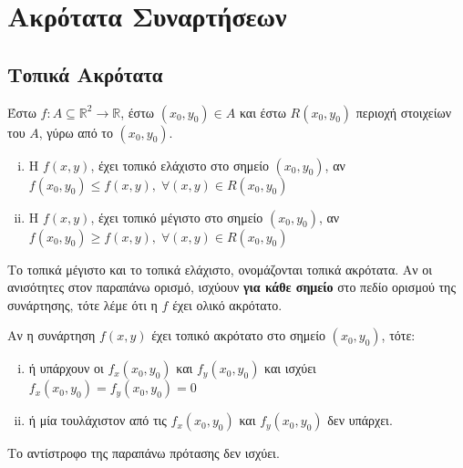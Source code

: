 \documentclass[a4paper,table]{report} 
\begin{document}
\chapter{Ακρότατα Συναρτήσεων}

\section{Τοπικά Ακρότατα}

\begin{mybox1}
\begin{dfn}
\item {}
  Έστω $ f \colon A \subseteq \mathbb{R}^{2} \to \mathbb{R} $, έστω 
  $ (x_{0}, y_{0}) \in A $ και έστω $R(x_{0}, y_{0}) $ περιοχή στοιχείων του $A$, 
  γύρω από το $ (x_{0}, y_{0}) $.
  \begin{enumerate}[i)]
    \item 
      Η $ f(x,y) $, έχει τοπικό ελάχιστο στο σημείο $ (x_{0}, y_{0}) $, αν 
      $ f(x_{0}, y_{0}) \leq f(x,y), \; \forall (x,y) \in R(x_{0}, y_{0}) $ 
    \item 
      Η $ f(x,y) $, έχει τοπικό μέγιστο στο σημείο $ (x_{0}, y_{0}) $, αν 
      $ f(x_{0}, y_{0}) \geq f(x,y), \; \forall (x,y) \in R(x_{0}, y_{0}) $ 
  \end{enumerate}
  Το τοπικά μέγιστο και το τοπικά ελάχιστο, ονομάζονται \textcolor{Col1}{τοπικά
  ακρότατα}. 
  Αν οι ανισότητες στον παραπάνω ορισμό, ισχύουν \textbf{για κάθε σημείο} στο πεδίο 
  ορισμού της συνάρτησης, τότε λέμε ότι η $f$ έχει \textcolor{Col1}{ολικό ακρότατο}.
\end{dfn}
\end{mybox1}

\begin{prop}\label{prop:fermat2}
\item {}
  Αν η συνάρτηση $ f(x,y) $ έχει τοπικό ακρότατο στο σημείο $ (x_{0}, y_{0}) $, 
  τότε:
  \begin{enumerate}[i)]
    \item ή υπάρχουν οι $ f_{x}(x_{0}, y_{0}) $ και $ f_{y}(x_{0}, y_{0}) $ 
      και ισχύει $ f_{x}(x_{0}, y_{0}) = f_{y}(x_{0}, y_{0} )=0 $
    \item ή μία τουλάχιστον από τις $ f_{x}(x_{0}, y_{0}) $ και 
      $ f_{y}(x_{0}, y_{0}) $ δεν υπάρχει.
  \end{enumerate}
\end{prop}

\begin{rem}
\item {}
  Το αντίστροφο της παραπάνω πρότασης δεν ισχύει. 
\end{rem}
\end{document}
